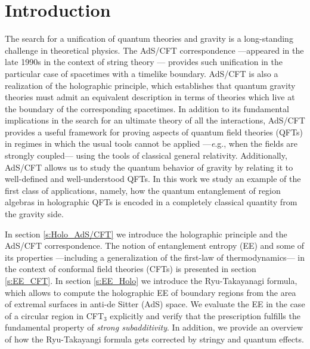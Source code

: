 \documentclass[twocolumn]{revtex4}
\begin{document}
\section{Introduction} \label{s:Intro}
The search for a unification of quantum theories and gravity is a long-standing challenge in theoretical physics. The AdS/CFT correspondence ---appeared in the late 1990s in the context of string theory \cite{maldacena_large_1999}--- provides such unification in the particular case of spacetimes with a timelike boundary. AdS/CFT is also a realization of the holographic principle, which establishes that quantum gravity theories must admit an equivalent description in terms of theories which live at the boundary of the corresponding spacetimes.  %
In addition to its fundamental implications in the search for an ultimate theory of all the interactions, AdS/CFT provides a useful framework for proving aspects of quantum field theories (QFTs) in regimes in which the usual tools cannot be applied ---{\emph e.g.,} when the fields are strongly coupled--- using the tools of classical general relativity. %
Additionally, AdS/CFT allows us to study the quantum behavior of gravity by relating it to well-defined and well-understood QFTs.
In this work we study an example of the first class of applications, namely, how the quantum entanglement of region algebras in holographic QFTs is encoded in a completely classical quantity from the gravity side.


In section \ref{s:Holo_AdS/CFT} we introduce the holographic principle and the AdS/CFT correspondence. The notion of entanglement entropy (EE) and some of its properties ---including a generalization of the first-law of thermodynamics--- in the context of conformal field theories (CFTs) is presented in section \ref{s:EE_CFT}. In section \ref{s:EE_Holo} we introduce the Ryu-Takayanagi formula, which allows to compute the holographic EE of boundary regions from the area of extremal surfaces in anti-de Sitter (AdS) space. We evaluate the EE in the case of a circular region in CFT$_3$ explicitly and verify that the prescription fulfills the fundamental property of {\it strong subadditivity}. In addition, we provide an overview of how the Ryu-Takayangi formula gets corrected by stringy and quantum effects. 
\end{document}
